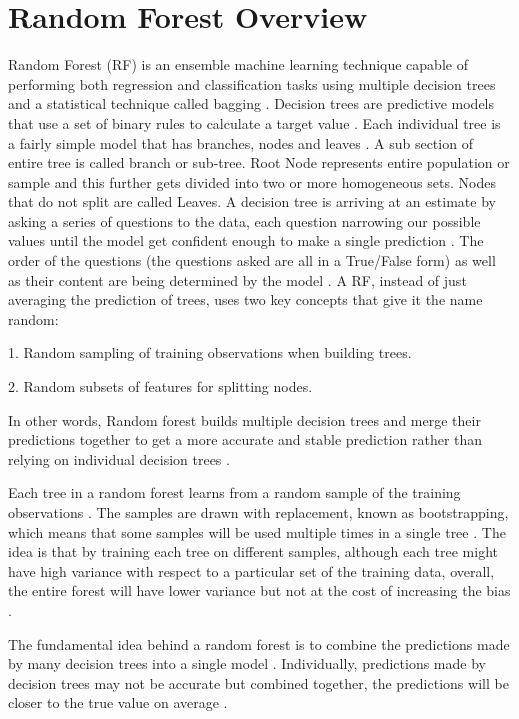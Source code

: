 \documentclass[]{llncs} %
\begin{document}
\section{Random Forest Overview}
Random Forest (RF) is an ensemble machine learning technique capable of performing both regression and classification tasks using multiple decision trees and a statistical technique called bagging \cite{RandomForest}. Decision trees are predictive models that use a set of binary rules to calculate a target value \cite{RandomForest}. Each individual tree is a fairly simple model that has branches, nodes and leaves  \cite{RandomForest}. A sub section of entire tree is called branch or sub-tree. Root Node represents entire population or sample and this further gets divided into two or more homogeneous sets. Nodes that do not split are called Leaves. A decision tree is arriving at an estimate by asking a series of questions to the data, each question narrowing our possible values until the model get confident enough to make a single prediction \cite{RandomForest}. The order of the questions (the questions asked are all in a True/False form) as well as their content are being determined by the model \cite{RandomForest}.
A RF, instead of just averaging the prediction of trees, uses two key concepts that give it the name random: \par
1. Random sampling of training observations when building trees.\par
2. Random subsets of features for splitting nodes.\par
In other words, Random forest builds multiple decision trees and merge their predictions together to get a more accurate and stable prediction rather than relying on individual decision trees \cite{RandomForest}.\par
Each tree in a random forest learns from a random sample of the training observations \cite{RandomForest}. The samples are drawn with replacement, known as bootstrapping, which means that some samples will be used multiple times in a single tree \cite{RandomForest}. The idea is that by training each tree on different samples, although each tree might have high variance with respect to a particular set of the training data, overall, the entire forest will have lower variance but not at the cost of increasing the bias \cite{RandomForest}. \par
The fundamental idea behind a random forest is to combine the predictions made by many decision trees into a single model \cite{RandomForest}. Individually, predictions made by decision trees may not be accurate but combined together, the predictions will be closer to the true value on average \cite{RandomForest}.\par
\end{document}
